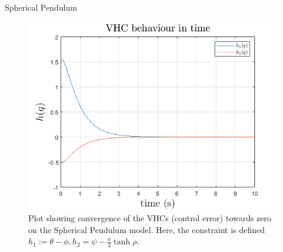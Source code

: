 \documentclass[xcolor=dvipsnames]{beamer}
\begin{document}
\begin{frame}{Spherical Pendulum}
\begin{figure}[h]
    \includegraphics[width=0.48\textheight]{assets/sp4.png}
        \caption{Plot showing convergence of the VHCs (control error) towards zero on the Spherical Pendulum model. Here, the constraint is defined $h_1:=\theta-\phi, h_2=\psi-\frac{\pi}{4}\tanh \rho.$}
    \label{fig:graph-pendulum}
\end{figure}
\end{frame}
\end{document}
